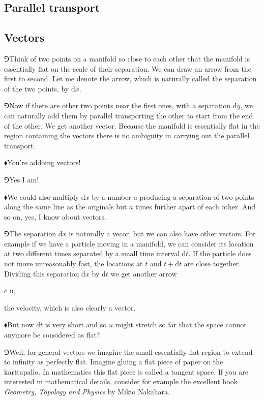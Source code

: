 \documentclass[10pt,oneside%
]{memoir}
\newenvironment{eqna}{\begin{IEEEeqnarray*}{c}}{\end{IEEEeqnarray*}\ignorespacesafterend}
\newcommand{\der}[2]{\frac{\dd#1}{\dd#2}}
\newcommand{\dd}{\mathrm{d}}
\newcommand{\hea}{\(\blacklozenge\)\;}
\newcommand{\heb}{\(\Game\)\;}
\begin{document}
\subsection{Parallel transport}
\subsection{Vectors}
\heb Think of two points on a manifold so close to each other that the manifold is essentially flat on the scale of their separation. We can draw an arrow from the first to second. Let me denote the arrow, which is naturally called the separation of the two points, by \(\dd x\).

\heb Now if there are other two points near the first ones, with a separation \(\dd y\), we can naturally add them by parallel transporting the other to start from the end of the other. We get another vector. Because the manifold is essentially flat in the region containing the vectors there is no ambiguity in carrying out the parallel transport.

\hea You're addoing vectors!

\heb Yes I am!

\hea We could also multiply \(\dd x\) by a number \(a\) producing a separation of two points along the same line as the originals but \(a\) times further apart of each other. And so on, yes, I know about vectors.

\heb The separation \(\dd x\) is naturally a vecor, but we can also have other vectors. For example if we have a particle moving in a manifold, we can consider its location at two different times separated by a small time interval \(\dd t\). If the particle does not move unreasonably fast, the locations at \(t\) and \(t+\dd t\) are close together. Dividing this separation \(\dd x\) by \(\dd t\) we get another arrow
\begin{eqna}
    \der{x}{t}\doteq u,
\end{eqna}
the velocity, which is also clearly a vector.

\hea But now \(\dd t\) is very short and so \(u\) might stretch so far that the space cannot anymore be considered as flat?

\heb Well, for general vectors we imagine the small essentially flat region to extend to infinity as perfectly flat. Imagine gluing a flat piece of paper on the karttapallo. In mathematics this flat piece is called a tangent space. If you are interested in mathematical details, consider for example the excellent book \emph{Geometry, Topology and Physics} by Mikio Nakahara.
\end{document}
